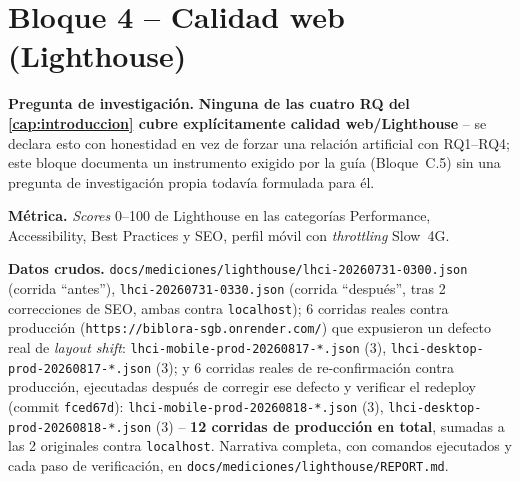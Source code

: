 \section{Bloque 4 -- Calidad web (Lighthouse)}
\label{sec:res-lighthouse}

\textbf{Pregunta de investigación.} \textbf{Ninguna de las cuatro RQ del
\autoref{cap:introduccion} cubre explícitamente calidad web/Lighthouse}
-- se declara esto con honestidad en vez de forzar una relación artificial
con RQ1--RQ4; este bloque documenta un instrumento exigido por la guía
(Bloque~C.5) sin una pregunta de investigación propia todavía formulada
para él.

\textbf{Métrica.} \emph{Scores} 0--100 de Lighthouse en las categorías
Performance, Accessibility, Best Practices y SEO, perfil móvil con
\emph{throttling} Slow~4G.

\textbf{Datos crudos.}
\texttt{docs/mediciones/lighthouse/lhci-20260731-0300.json} (corrida
``antes''), \texttt{lhci-20260731-0330.json} (corrida ``después'', tras 2
correcciones de SEO, ambas contra \texttt{localhost}); 6 corridas reales
contra producción (\texttt{https://biblora-sgb.onrender.com/}) que
expusieron un defecto real de \emph{layout shift}:
\texttt{lhci-mobile-prod-20260817-*.json} (3),
\texttt{lhci-desktop-prod-20260817-*.json} (3); y 6 corridas reales de
re-confirmación contra producción, ejecutadas después de corregir ese
defecto y verificar el redeploy (commit \texttt{fced67d}):
\texttt{lhci-mobile-prod-20260818-*.json} (3),
\texttt{lhci-desktop-prod-20260818-*.json} (3) -- \textbf{12 corridas de
producción en total}, sumadas a las 2 originales contra
\texttt{localhost}. Narrativa completa, con comandos ejecutados y cada
paso de verificación, en \texttt{docs/mediciones/lighthouse/REPORT.md}.

